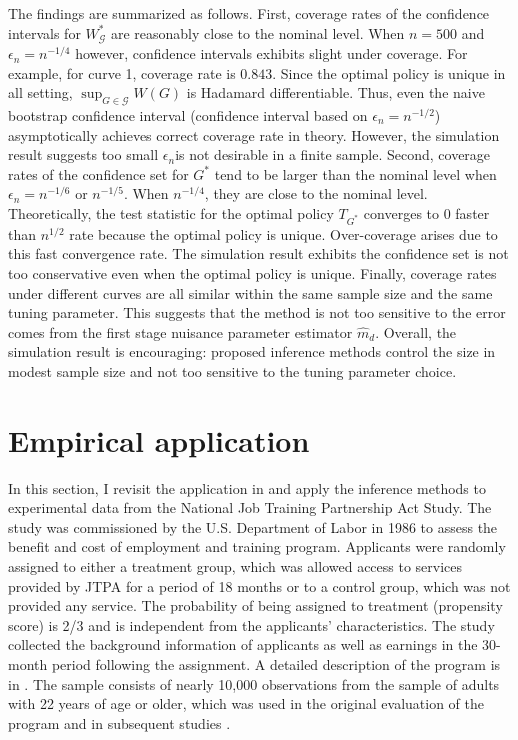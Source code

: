 \documentclass[12pt,oneside,reqno,english]{amsart}
\theoremstyle{definition}
\begin{document}
The findings are summarized as follows.
First, coverage rates of the confidence intervals for $W^{*}_{\mathcal{G}}$ are reasonably close to the nominal level.  
When $n=500$ and $\epsilon_{n}=n^{-1/4}$ however, confidence intervals exhibits slight under coverage. For example, for curve 1, coverage rate is $0.843$. 
Since the optimal policy is unique in all setting, $\sup_{G\in \mathcal{G}}W(G)$ is Hadamard differentiable. 
Thus, even the naive bootstrap confidence interval (confidence interval based on $\epsilon_{n}=n^{-1/2}$) asymptotically achieves correct coverage rate in theory. 
However, the simulation result suggests too small $\epsilon_{n}$is not desirable in a finite sample. 
Second, coverage rates of the confidence set for $G^{*}$ tend to be larger than the nominal level when $\epsilon_{n}=n^{-1/6}$ or $n^{-1/5}$. 
When $n^{-1/4}$, they are close to the nominal level. 
Theoretically, the test statistic for the optimal policy $T_{G^{*}}$ converges to $0$ faster than $n^{1/2}$ rate because the optimal policy is unique. 
Over-coverage arises due to this fast convergence rate. The simulation result exhibits the confidence set is not too conservative even when the optimal policy is unique. 
Finally, coverage rates under different curves are all similar within the same sample size and the same tuning parameter.  
This suggests that the method is not too sensitive to the error comes from the first stage nuisance parameter estimator $\hat{m}_{d}$.    
Overall, the simulation result is encouraging: proposed inference methods control the size in modest sample size and not too sensitive to the tuning parameter choice.  

\section{Empirical application}\label{application}
In this section, I revisit the application in \cite{KT:18} 
and apply the inference methods to experimental data from the National Job Training Partnership Act Study. 
The study was commissioned by the U.S. Department of Labor in 1986 to assess the benefit and cost of employment and training program. 
Applicants were randomly assigned to either a treatment group, which was allowed access to services provided by JTPA for a period of 18 months or to a control group, which was not provided any service. The probability of being assigned to treatment (propensity score) is 2/3 and is independent from the applicants' characteristics. 
The study collected the background information of applicants as well as earnings in the 30-month period following the assignment. 
A detailed description of the program is in 
\cite{Bloom:97}.
The sample consists of nearly 10,000 observations from the sample of adults with 22 years of age or older, which was used in the original evaluation
of the program and in subsequent studies 
\citep{Bloom:97, AAI:02}.
\end{document}
